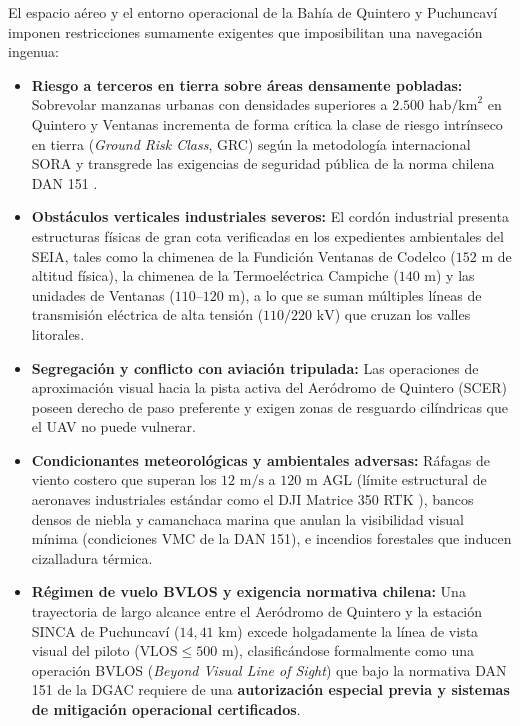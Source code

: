 \documentclass[letterpaper,12pt]{article}
\begin{document}
El espacio aéreo y el entorno operacional de la Bahía de Quintero y Puchuncaví imponen restricciones sumamente exigentes que imposibilitan una navegación ingenua:
\begin{itemize}
    \item \textbf{Riesgo a terceros en tierra sobre áreas densamente pobladas:} Sobrevolar manzanas urbanas con densidades superiores a $2.500\text{ hab/km}^2$ en Quintero y Ventanas incrementa de forma crítica la clase de riesgo intrínseco en tierra (\textit{Ground Risk Class}, GRC) según la metodología internacional SORA \cite{sora} y transgrede las exigencias de seguridad pública de la norma chilena DAN 151 \cite{dan151}.
    \item \textbf{Obstáculos verticales industriales severos:} El cordón industrial presenta estructuras físicas de gran cota verificadas en los expedientes ambientales del SEIA, tales como la chimenea de la Fundición Ventanas de Codelco ($152\text{ m}$ de altitud física), la chimenea de la Termoeléctrica Campiche ($140\text{ m}$) y las unidades de Ventanas ($110\text{--}120\text{ m}$), a lo que se suman múltiples líneas de transmisión eléctrica de alta tensión ($110/220\text{ kV}$) que cruzan los valles litorales.
    \item \textbf{Segregación y conflicto con aviación tripulada:} Las operaciones de aproximación visual hacia la pista activa del Aeródromo de Quintero (SCER) poseen derecho de paso preferente y exigen zonas de resguardo cilíndricas que el UAV no puede vulnerar.
    \item \textbf{Condicionantes meteorológicas y ambientales adversas:} Ráfagas de viento costero que superan los $12\text{ m/s}$ a $120\text{ m}$ AGL (límite estructural de aeronaves industriales estándar como el DJI Matrice 350 RTK \cite{dji}), bancos densos de niebla y camanchaca marina que anulan la visibilidad visual mínima (condiciones VMC de la DAN 151), e incendios forestales que inducen cizalladura térmica.
    \item \textbf{Régimen de vuelo BVLOS y exigencia normativa chilena:} Una trayectoria de largo alcance entre el Aeródromo de Quintero y la estación SINCA de Puchuncaví ($14{,}41\text{ km}$) excede holgadamente la línea de vista visual del piloto ($\text{VLOS} \le 500\text{ m}$), clasificándose formalmente como una operación BVLOS (\textit{Beyond Visual Line of Sight}) que bajo la normativa DAN 151 de la DGAC requiere de una \textbf{autorización especial previa y sistemas de mitigación operacional certificados}.
\end{itemize}
\end{document}
